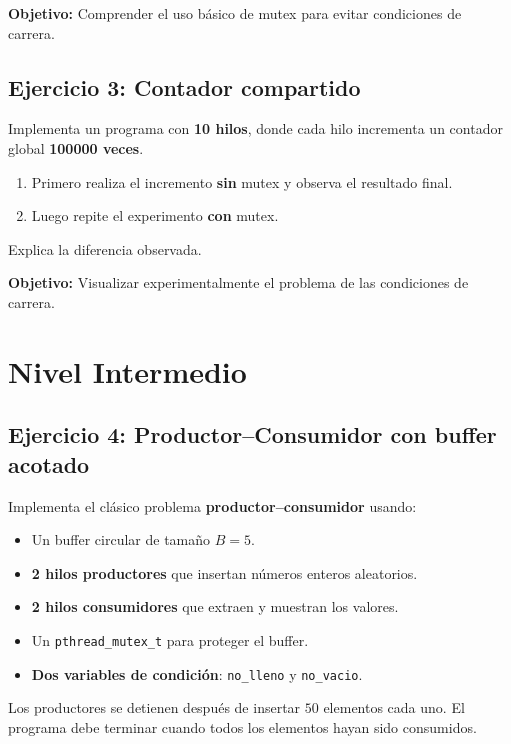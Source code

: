 \documentclass[11pt,a4paper]{article}
\begin{document}
\textbf{Objetivo:} Comprender el uso básico de mutex para evitar condiciones de carrera.

\subsection*{Ejercicio 3: Contador compartido}
Implementa un programa con \textbf{10 hilos}, donde cada hilo incrementa un contador global \textbf{100000 veces}. 
\begin{enumerate}[label=\alph*)]
    \item Primero realiza el incremento \textbf{sin} mutex y observa el resultado final.
    \item Luego repite el experimento \textbf{con} mutex.
\end{enumerate}
Explica la diferencia observada.

\textbf{Objetivo:} Visualizar experimentalmente el problema de las condiciones de carrera.

\bigskip

\section{Nivel Intermedio}

\subsection*{Ejercicio 4: Productor--Consumidor con buffer acotado}
Implementa el clásico problema \textbf{productor--consumidor} usando:
\begin{itemize}
    \item Un buffer circular de tamaño $B = 5$.
    \item \textbf{2 hilos productores} que insertan números enteros aleatorios.
    \item \textbf{2 hilos consumidores} que extraen y muestran los valores.
    \item Un \texttt{pthread\_mutex\_t} para proteger el buffer.
    \item \textbf{Dos variables de condición}: \texttt{no\_lleno} y \texttt{no\_vacio}.
\end{itemize}

Los productores se detienen después de insertar $50$ elementos cada uno. El programa debe terminar cuando todos los elementos hayan sido consumidos.
\end{document}
